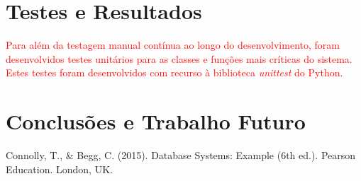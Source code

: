\documentclass[a4paper,12pt]{scrreprt}
\begin{document}
\chapter{Testes e Resultados}

\textcolor{red}{
    Para além da testagem manual contínua ao longo do desenvolvimento, foram
    desenvolvidos testes unitários para as classes e funções mais críticas do
    sistema. Estes testes foram desenvolvidos com recurso à biblioteca
    \textit{unittest} do Python.
}



\chapter{Conclusões e Trabalho Futuro}



\renewcommand\bibname{Referências}

\begin{thebibliography}{9}

Connolly, T., \& Begg, C. (2015). Database Systems: Example (6th ed.). Pearson Education. London, UK.


\end{thebibliography}

\end{document}
